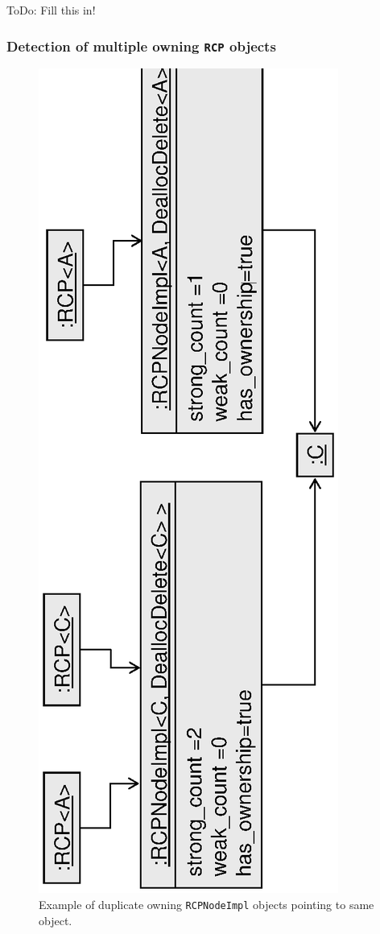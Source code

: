 \documentclass[pdf,ps2pdf,11pt]{SANDreport}
\begin{document}
ToDo: Fill this in!


%
{}\subsubsection{Detection of multiple owning {}\texttt{RCP} objects}
\label{sec:detection-dual-owning-rcps}
%

{\bsinglespace
\begin{figure}
\begin{center}
\includegraphics*[angle=270,scale=0.65]{RCPEx2}
\end{center}
\caption{
\label{fig:RCPEx2}
Example of duplicate owning {}\texttt{RCPNodeImpl} objects pointing to
same object. }
\end{figure}
\esinglespace}
\end{document}
